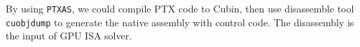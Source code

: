 By using {\tt PTXAS}, we could compile PTX code to Cubin, then use disassemble
tool {\tt cuobjdump} to generate the native assembly with control code. The disassembly is the input of GPU ISA solver.
